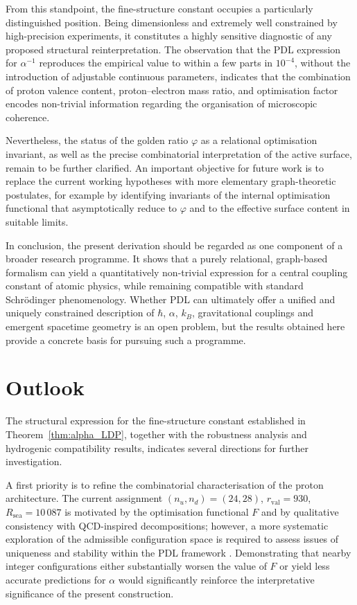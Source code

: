 \documentclass[11pt,a4paper]{article}
\theoremstyle{plain}
\theoremstyle{definition}
\theoremstyle{remark}
\begin{document}
From this standpoint, the fine-structure constant occupies a particularly distinguished position. Being dimensionless and extremely well constrained by high-precision experiments, it constitutes a highly sensitive diagnostic of any proposed structural reinterpretation. The observation that the PDL expression for \(\alpha^{-1}\) reproduces the empirical value to within a few parts in \(10^{-4}\), without the introduction of adjustable continuous parameters, indicates that the combination of proton valence content, proton–electron mass ratio, and optimisation factor encodes non-trivial information regarding the organisation of microscopic coherence.

Nevertheless, the status of the golden ratio \(\varphi\) as a relational optimisation invariant, as well as the precise combinatorial interpretation of the active surface, remain to be further clarified. An important objective for future work is to replace the current working hypotheses with more elementary graph-theoretic postulates, for example by identifying invariants of the internal optimisation functional that asymptotically reduce to \(\varphi\) and to the effective surface content in suitable limits.

In conclusion, the present derivation should be regarded as one component of a broader research programme. It shows that a purely relational, graph-based formalism can yield a quantitatively non-trivial expression for a central coupling constant of atomic physics, while remaining compatible with standard Schrödinger phenomenology. Whether PDL can ultimately offer a unified and uniquely constrained description of \(\hbar\), \(\alpha\), \(k_B\), gravitational couplings and emergent spacetime geometry is an open problem, but the results obtained here provide a concrete basis for pursuing such a programme.

\section{Outlook}

The structural expression for the fine-structure constant established in Theorem~\ref{thm:alpha_LDP}, together with the robustness analysis and hydrogenic compatibility results, indicates several directions for further investigation.

A first priority is to refine the combinatorial characterisation of the proton architecture. The current assignment \((n_u,n_d) = (24,28)\), \(r_{\mathrm{val}} = 930\), \(R_{\mathrm{sea}} = 10\,087\) is motivated by the optimisation functional \(F\) and by qualitative consistency with QCD-inspired decompositions; however, a more systematic exploration of the admissible configuration space is required to assess issues of uniqueness and stability within the PDL framework \cite{Laubscher2026PDL_English,Laubscher2026LDP_French}. Demonstrating that nearby integer configurations either substantially worsen the value of \(F\) or yield less accurate predictions for \(\alpha\) would significantly reinforce the interpretative significance of the present construction.
\end{document}
